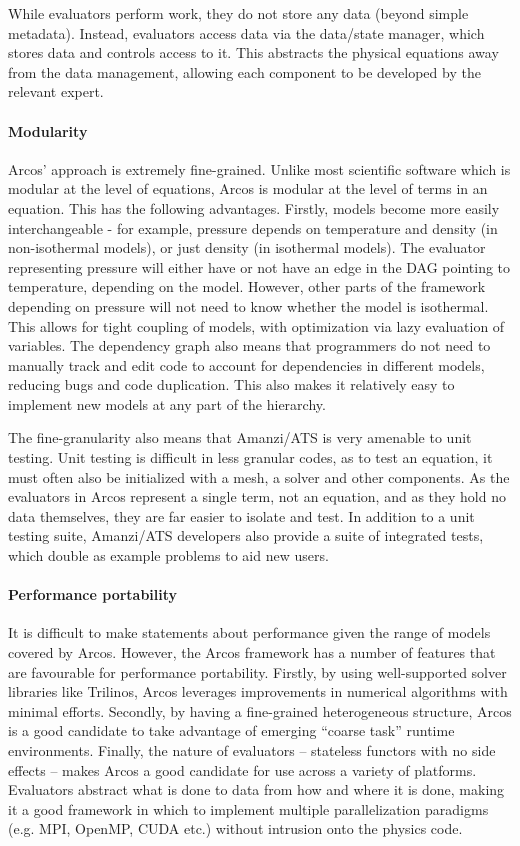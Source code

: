 While evaluators perform work, they do not store any data (beyond simple metadata).
Instead, evaluators access data via the data/state manager, which stores data and controls access to it.
This abstracts the physical equations away from the data management, allowing each component to be developed by the relevant expert.

\paragraph{Modularity}
Arcos' approach is extremely fine-grained.
Unlike most scientific software which is modular at the level of equations, Arcos is modular at the level of terms in an equation.
This has the following advantages.
Firstly, models become more easily interchangeable - for example, pressure depends on temperature and density (in non-isothermal models), or just density (in isothermal models). The evaluator representing pressure will either have or not have an edge in the DAG pointing to temperature, depending on the model.
However, other parts of the framework depending on pressure will not need to know whether the model is isothermal.
This allows for tight coupling of models, with optimization via lazy evaluation of variables.
The dependency graph also means that programmers do not need to manually track and edit code to account for dependencies in different models, reducing bugs and code duplication.
This also makes it relatively easy to implement new models at any part of the hierarchy.

The fine-granularity also means that Amanzi/ATS is very amenable to unit testing.
Unit testing is difficult in less granular codes, as to test an equation, it must often also be initialized with a mesh, a solver and other components.
As the evaluators in Arcos represent a single term, not an equation, and as they hold no data themselves, they are far easier to isolate and test. 
In addition to a unit testing suite, Amanzi/ATS developers also provide a suite of integrated tests, which double as example problems to aid new users. 

\paragraph{Performance portability}
It is difficult to make statements about performance given the range of models covered by Arcos.
However, the Arcos framework has a number of features that are favourable for performance portability.
Firstly, by using well-supported solver libraries like Trilinos, Arcos leverages improvements in numerical algorithms with minimal efforts.
Secondly, by having a fine-grained heterogeneous structure, Arcos is a good candidate to take advantage of emerging ``coarse task'' runtime environments.
Finally, the nature of evaluators -- stateless functors with no side effects -- makes Arcos a good candidate for use across a variety of platforms. 
Evaluators abstract what is done to data from how and where it is done, making it a good framework in which to implement multiple parallelization paradigms (e.g. MPI, OpenMP, CUDA etc.) without intrusion onto the physics code. 

